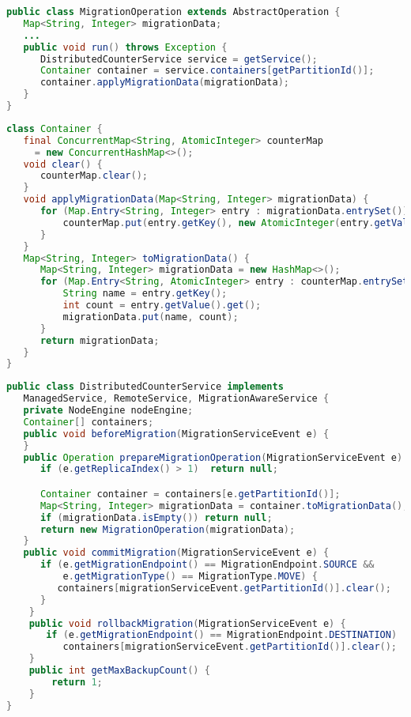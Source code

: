 \begin{lstlisting}[language=java]
public class MigrationOperation extends AbstractOperation {
   Map<String, Integer> migrationData;
   ...
   public void run() throws Exception {
      DistributedCounterService service = getService();
      Container container = service.containers[getPartitionId()];
      container.applyMigrationData(migrationData);
   }
}
\end{lstlisting}

\begin{lstlisting}[language=java]
class Container {
   final ConcurrentMap<String, AtomicInteger> counterMap 
     = new ConcurrentHashMap<>();
   void clear() {
      counterMap.clear();
   }
   void applyMigrationData(Map<String, Integer> migrationData) {
      for (Map.Entry<String, Integer> entry : migrationData.entrySet()) {
          counterMap.put(entry.getKey(), new AtomicInteger(entry.getValue()));
      }
   }
   Map<String, Integer> toMigrationData() {
      Map<String, Integer> migrationData = new HashMap<>();
      for (Map.Entry<String, AtomicInteger> entry : counterMap.entrySet()) {
          String name = entry.getKey();
          int count = entry.getValue().get();
          migrationData.put(name, count);
      }
      return migrationData;
   }
}
\end{lstlisting}

\begin{lstlisting}[language=java]
public class DistributedCounterService implements 
   ManagedService, RemoteService, MigrationAwareService {
   private NodeEngine nodeEngine;
   Container[] containers;
   public void beforeMigration(MigrationServiceEvent e) {
   } 
   public Operation prepareMigrationOperation(MigrationServiceEvent e) {
      if (e.getReplicaIndex() > 1)  return null;

      Container container = containers[e.getPartitionId()];
      Map<String, Integer> migrationData = container.toMigrationData();
      if (migrationData.isEmpty()) return null;
      return new MigrationOperation(migrationData);
   }
   public void commitMigration(MigrationServiceEvent e) {
      if (e.getMigrationEndpoint() == MigrationEndpoint.SOURCE && 
          e.getMigrationType() == MigrationType.MOVE) {
         containers[migrationServiceEvent.getPartitionId()].clear();
      }
    }
    public void rollbackMigration(MigrationServiceEvent e) {
       if (e.getMigrationEndpoint() == MigrationEndpoint.DESTINATION)
          containers[migrationServiceEvent.getPartitionId()].clear();
    }
    public int getMaxBackupCount() {
        return 1;
    }
}
\end{lstlisting}

